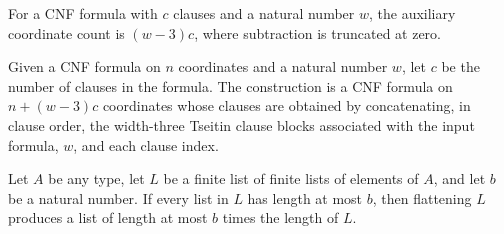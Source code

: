 \begin{definition}
\label{FABL.widthThreeTseitinAuxiliaryCount}
\leanok
{}
For a CNF formula with $c$ clauses and a natural number $w$, the auxiliary coordinate
count is $(w-3)c$, where subtraction is truncated at zero.
\end{definition}

\begin{definition}
\label{FABL.widthThreeTseitin}
\leanok
{}
Given a CNF formula on $n$ coordinates and a natural number $w$, let $c$ be the number
of clauses in the formula. The construction is a CNF formula on $n+(w-3)c$ coordinates
whose clauses are obtained by concatenating, in clause order, the width-three Tseitin
clause blocks associated with the input formula, $w$, and each clause index.
\end{definition}

\begin{theorem}
\label{FABL.length_flatten_le_mul}
\leanok
{}
Let $A$ be any type, let $L$ be a finite list of finite lists of elements of $A$, and
let $b$ be a natural number. If every list in $L$ has length at most $b$, then
flattening $L$ produces a list of length at most $b$ times the length of $L$.
\end{theorem}

